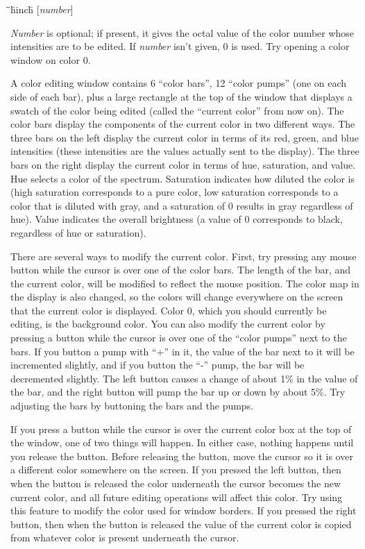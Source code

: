 \documentclass[letterpaper,twoside,12pt]{article}
\def\hinch{\hspace*{0.5in}}
\def\starti{\begin{center}\begin{tabbing}\hinch\=\hinch\=\hinch\=hinch\hinch\=\kill}
\def\endi{\end{tabbing}\end{center}}
\def\ii{\>\>\>}
\begin{document}
\starti
   \ii {\bfseries :specialopen color }[{\itshape number}]
\endi

{\itshape Number} is optional;  if present, it gives the octal value of
the color number whose intensities are to be edited.  If {\itshape number}
isn't given, 0 is used.  Try opening a color window on color 0.

A color editing window contains 6 ``color bars'', 12 ``color pumps''
(one on each side of each bar), plus a large rectangle at the top
of the window that displays a swatch of the color being edited
(called the ``current color'' from now on).
The color bars display the components of the current color in
two different ways.  The three bars on the left display the
current color in terms of its red, green, and blue intensities
(these intensities are the values actually sent to the display).
The three bars on the right display the current color in terms
of hue, saturation, and value.  Hue selects a color of
the spectrum.  Saturation indicates how diluted the color is
(high saturation corresponds to a pure color, low saturation
corresponds to a color that is diluted with gray, and a saturation
of 0 results in gray regardless of hue).  Value
indicates the overall brightness (a value of 0 corresponds to black,
regardless of hue or saturation).

There are several ways to modify the current color.  First, try
pressing any mouse button while the cursor is over one of the
color bars.  The length of the bar, and the current color,
will be modified to reflect the mouse position.  The color map
in the display is also changed, so the colors will change everywhere
on the screen that the current color is displayed.  Color 0, which
you should currently be editing, is the background color.  You
can also modify the current color by pressing a button while the
cursor is over one of the ``color pumps'' next to the bars.  If
you button a pump with ``+'' in it, the value of the bar next
to it will be incremented slightly, and if you button the ``-''
pump, the bar will be decremented slightly.  The left button causes
a change of about 1\% in the value of the bar, and the right button
will pump the bar up or down by about 5\%.  Try adjusting the bars
by buttoning the bars and the pumps.

If you press a button while the cursor is over the current color
box at the top of the window, one of two things will happen.
In either case, nothing happens until you release the button.
Before releasing the button, move the cursor so it is over a
different color somewhere on the screen.  If you pressed the
left button, then when the button is released the color underneath
the cursor becomes the new current color, and all future editing
operations will affect this color.  Try using this feature to
modify the color used for window borders.  If you pressed the right
button, then when the button is released
the value of the current color is copied from whatever color is
present underneath the cursor.
\end{document}
